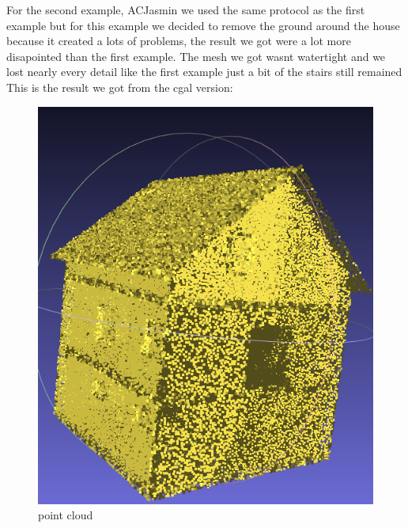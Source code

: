 \documentclass{article}
\begin{document}
For the second example, ACJasmin we used the same protocol as the first example but for 
this example we decided to remove the ground around the house because it created a lots of problems,
the result we got were a lot more disapointed than the first example.
The mesh we got  wasnt watertight and we lost nearly every detail like the first example 
just a bit of the stairs still remained
This is the result we got from the cgal version:
\vspace{\baselineskip}
\begin{figure}[H]
  \centering
  \begin{minipage}[t]{0.29\textwidth}
    \includegraphics[width=\textwidth]{../../images/screen_kinetic/ACJasmin_point_cloud.png}
    \caption*{point cloud}
  \end{minipage}
  \hspace{0.05\textwidth}
  \begin{minipage}[t]{0.29\textwidth}

\end{minipage}
\end{figure}
\end{document}
